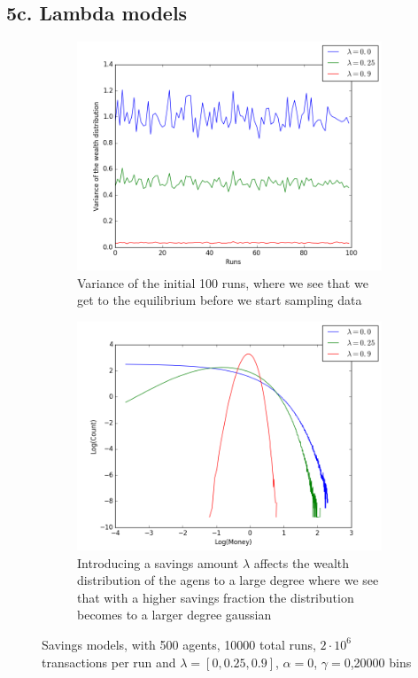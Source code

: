 \documentclass[a4paper,11pt]{article}
\begin{document}
{\subsection{5c. Lambda models}


\begin{figure}[H]
	\centering
	\begin{subfigure}[t]{0.45\textwidth}
		\includegraphics[scale=0.4]{savinginit}
		\caption{Variance of the initial 100 runs, where we see that we get to the equilibrium before we start sampling data}
		\label{fig:savinginit}
	\end{subfigure}
	\begin{subfigure}[t]{0.45\textwidth}
		\includegraphics[scale=0.4]{Saving}
		\caption{Introducing a savings amount $\lambda$ affects the wealth distribution of the agens to a large degree where we see that with a higher savings fraction the distribution becomes to a larger degree gaussian}
		\label{fig:Saving}
	\end{subfigure}
	\caption{Savings models, with 500 agents, 10000 total runs, $2\cdot 10^{6}$ transactions per run and  $\lambda=[0,0.25,0.9]$, $\alpha=0$, $\gamma=0$,20000 bins}
	\label{fig:savings}
\end{figure}

}
\end{document}
